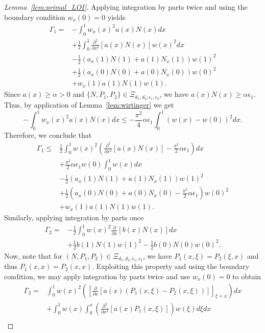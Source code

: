 \documentclass[US letter, 9 pt, conference]{ieeeconf}  \usepackage{setspace}
\newcommand{\pfx}{\frac{\partial}{\partial x}}
\newcommand{\igzo}{\int_0^1}
\newcommand{\igzx}{\int_0^x}
\newcommand{\hlf}{\frac{1}{2}}
\begin{document}
\begin{proof}[Lemma~\ref{lem:primal_LOI}]
Applying integration by parts twice and using the boundary condition $w_x(0)=0$ yields
 \begin{align*}
 \Gamma_1 =& - \igzo w_x(x)^2 a(x)N(x)dx \\
 &+ \hlf \igzo  \frac{\partial^2}{\partial x^2} \left[ a(x)N(x)\right] w(x)^2 dx \\
 &-  \frac{1}{2}\left(a_x(1)N(1)+ a(1)N_x(1) \right) w(1)^2 \\
 &+\hlf \left(a_x(0)N(0)+a(0)N_x(0) \right)w(0)^2 \\
 &+ w_x(1)a(1)N(1) w(1).
 \end{align*}
 Since $a(x) \geq \alpha >0$ and $\{N,P_1,P_2\} \in \Xi_{d_1,d_2,\epsilon_1,\epsilon_2}$, we have $a(x)N(x) \geq \alpha \epsilon_1$. Thus, by application of Lemma~\ref{lem:wirtinger} we get
 \[
 - \igzo w_x(x)^2 a(x)N(x) dx \leq -\frac{\pi^2}{4}\alpha \epsilon_1 \igzo \left(w(x)-w(0)\right)^2 dx.
 \]
Therefore, we conclude that
 \begin{align}
 \Gamma_1 \leq & \hlf \igzo w(x)^2\left( \frac{\partial^2}{\partial x^2} \left[ a(x)N(x)\right] -\frac{\pi^2}{2} \alpha \epsilon_1\right) dx \nonumber \\
 &+\frac{\pi^2}{2}\alpha \epsilon_1 w(0)\igzo w(x)dx \nonumber \\ 
 &  - \frac{1}{2}\left(a_x(1)N(1)+ a(1)N_x(1) \right) w(1)^2 \nonumber \\
&+\hlf \left(a_x(0)N(0)+a(0)N_x(0)-\frac{\pi^2}{2}\alpha \epsilon_1 \right)w(0)^2 \nonumber \\ 
 &\label{Gamma_1}+w_x(1) a(1)N(1)w(1). 
\end{align}
Similarly, applying integration by parts once
 \begin{align}
 \Gamma_2 =&  - \hlf \igzo w(x)^2   \pfx \left[ b(x)N(x)\right] dx \nonumber \\
 &\label{Gamma_2} +   \frac{1}{2}b(1)N(1) w(1)^2-\hlf b(0)N(0)w(0)^2.
 \end{align}
Now, note that for $(N,P_1,P_2) \in \Xi_{d_1,d_2,\epsilon_1,\epsilon_2}$, we have $P_1(x,\xi)=P_2(\xi,x)$ and thus $P_1(x,x)=P_2(x,x)$. Exploiting this property and using the boundary condition, we may apply integration by parts twice and use $w_x(0)=0$ to obtain 
\begin{align}
 \Gamma_3  = &\igzo w(x)^2\left( \left[ \pfx \left[a(x)(P_1(x,\xi)-P_2(x,\xi)) \right] \right]_{\xi=x} \right) dx \nonumber \\
 &  +  \igzo w(x)\igzx  \left( \frac{\partial^2}{\partial x^2}\left[a(x)P_1(x,\xi) \right] \right) w(\xi) d\xi dx \nonumber \\

\end{align}
\end{proof}
\end{document}
